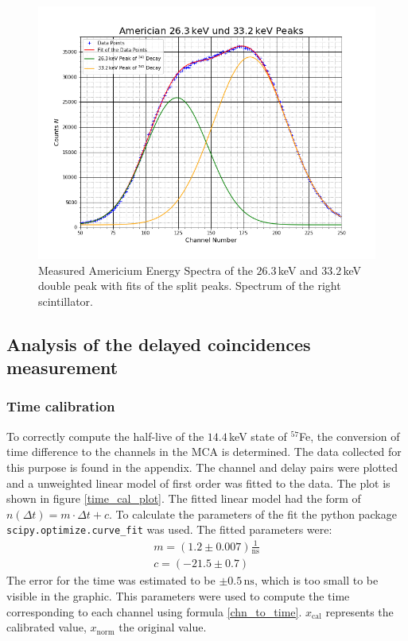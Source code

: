 \documentclass[30pt,a4paper]{article}
\begin{document}
 	\begin{figure}[h]
 		\includegraphics[scale=0.5]{Bilder/kleine_Peaks1}
 		\centering
 		\caption[Americium Spectra Double Peak Right Detector Side]{Measured Americium Energy Spectra of the $26.3$\,keV and $33.2$\,keV double peak with fits of the split peaks. Spectrum of the right scintillator.}
 		\label{ASR}
 	\end{figure}
 	\FloatBarrier
 	\subsection{Analysis of the delayed coincidences measurement}
 	\subsubsection{Time calibration}
 	To correctly compute the half-live of the $14.4$\,keV state of $^{57}$Fe, the conversion of time difference to the channels in the MCA is determined. 
 	The data collected for this purpose is found in the appendix. 
 	The channel and delay pairs were plotted and a unweighted linear model of first
 	order was fitted to the data. The plot is shown in figure \ref{time_cal_plot}.
 	The fitted linear model had the form of $n(\Delta t) = m \cdot \Delta t + c$. To calculate the parameters of the fit the python package \verb|scipy.optimize.curve_fit|\cite{SciPy_Opti} was used.	The fitted parameters were:
 	\begin{eqnarray}
 	m = (1.2 \pm 0.007)\frac{1}{\textrm{ns}} \\
 	c = (-21.5 \pm 0.7)
 	\end{eqnarray}
 	The error for the time was estimated to be $\pm 0.5\,\textrm{ns}$, which is too small
 	to be visible in the graphic.
 	This parameters were used to compute the time corresponding to each channel using 
 	formula \ref{chn_to_time}. $x_{\text{cal}}$ represents the calibrated value, $x_{\text{norm}}$ the original value.
 	
\end{document}
